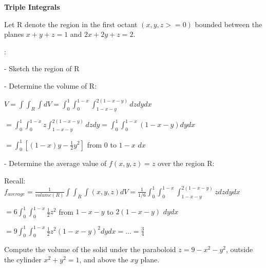 \documentclass[12pt]{article}
\begin{document}
	{\centering \huge \bf Triple Integrals \par}
	\vspace{10pt}
	\vspace{10pt}
	
	 \noindent Let R denote the region in the first octant $(x,y,z >= 0)$ bounded between the planes $x + y + z = 1$ and $2x+2y+z = 2$.
	
	\vspace{20pt}
	
	: 
	\vspace{20pt}
	
	\noindent - Sketch the region of R
	
	\vspace{20pt}
	
	\noindent - Determine the volume of R:
	\vspace{10pt}
		
	$V = \int\int_R\int dV = \int_0^1\int_0^{1-x}\int_{1-x-y}^{2(1-x-y)} dzdydx$
	\vspace{10pt}
		
	$= \int_0^1\int_0^{1-x} z \int_{1-x-y}^{2(1-x-y)} dzdy = \int_0^1\int_0^{1-x}
	 (1-x-y) dy dx$
	 \vspace{10pt}
		
	$= \int_0^1[(1-x)y-\frac{1}{2}y^2]$ from $0$ to $1-x$  $dx$
	\vspace{20pt}
	
	
	\noindent - Determine the average value of $f(x,y,z)=z$ over the region R:
	\vspace{10pt}
	
	Recall: $f_{average} = \frac{1}{volume(R)} \int\int_R\int(x,y,z)dV = \frac{1}{1/6} \int_0^1\int_0^{1-x}\int_{1-x-y}^{2(1-x-y)} zdzdydx$
	\vspace{10pt}
		
	$= 6 \int_0^1\int_0^{1-x}\frac{1}{2}z^2$ from $1-x-y$ to $2(1-x-y)$ $dydx$
	\vspace{10pt}
		
	$= 9 \int_0^1\int_0^{1-x}\frac{1}{2}z^2 (1-x-y)^2 dydx =...= \frac{3}{4}$
	\vspace{30pt}
	
	\vspace{10pt}
	
	\noindent Compute the volume of the solid under the paraboloid $z=9-x^2-y^2$, outside the cylinder $x^2+y^2=1$, and above the $xy$ plane.
	
	\vspace{20pt}
	
\end{document}
